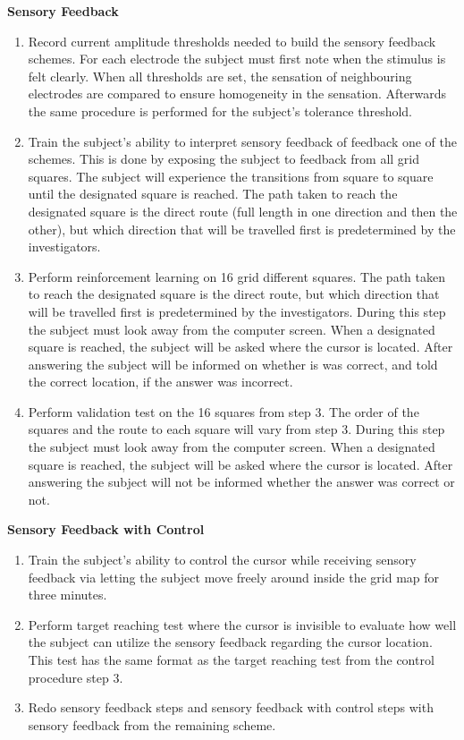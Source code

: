 \textbf{Sensory Feedback} \\
\vspace{-25pt}
\begin{enumerate}
	\item Record current amplitude thresholds needed to build the sensory feedback schemes. For each electrode the subject must first note when the stimulus is felt clearly. When all thresholds are set, the sensation of neighbouring electrodes are compared to ensure homogeneity in the sensation. Afterwards the same procedure is performed for the subject's tolerance threshold. 
	\item Train the subject's ability to interpret sensory feedback of feedback one of the schemes. This is done by exposing the subject to feedback from all grid squares. The subject will experience the transitions from square to square until the designated square is reached. The path taken to reach the designated square is the direct route (full length in one direction and then the other), but which direction that will be travelled first is predetermined by the investigators.
	\item Perform reinforcement learning on 16 grid different squares. The path taken to reach the designated square is the direct route, but which direction that will be travelled first is predetermined by the investigators. During this step the subject must look away from the computer screen. When a designated square is reached, the subject will be asked where the cursor is located. After answering the subject will be informed on whether is was correct, and told the correct location, if the answer was incorrect. 
	\item Perform validation test on the 16 squares from step 3. The order of the squares and the route to each square will vary from step 3. During this step the subject must look away from the computer screen. When a designated square is reached, the subject will be asked where the cursor is located. After answering the subject will not be informed whether the answer was correct or not.
\end{enumerate}

\textbf{Sensory Feedback with Control} \\
\vspace{-25pt}
\begin{enumerate}
	\item Train the subject's ability to control the cursor while receiving sensory feedback via letting the subject move freely around inside the grid map for three minutes.
	\item Perform target reaching test where the cursor is invisible to evaluate how well the subject can utilize the sensory feedback regarding the cursor location. This test has the same format as the target reaching test from the control procedure step 3.
	\item Redo sensory feedback steps and sensory feedback with control steps with sensory feedback from the remaining scheme.
\end{enumerate}


